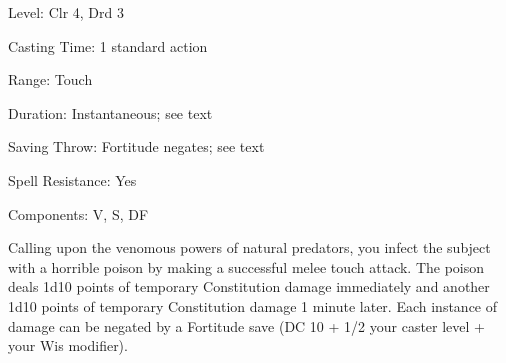 
\begin{description*}
\item[Level:] Clr 4, Drd 3
\item[Casting Time:] 1 standard action
\item[Range:] Touch
\item[Duration:] Instantaneous; see text
\item[Saving Throw:] Fortitude negates; see text
\item[Spell Resistance:] Yes
\item[Components:] V, S, DF
\end{description*}

Calling upon the venomous powers of natural predators, you infect the subject with
a horrible poison by making a successful melee touch attack. The poison deals 1d10
points of temporary Constitution damage immediately and another 1d10 points of
temporary Constitution damage 1 minute later. Each instance of damage can be negated
by a Fortitude save (DC 10 + 1/2 your caster level + your Wis modifier).